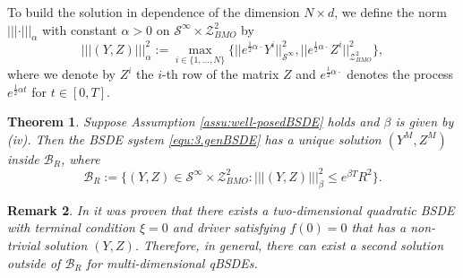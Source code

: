 \documentclass[10pt,a4paper]{article}
\theoremstyle{plain}
\newtheorem{Theorem}{Theorem}[section]
\newtheorem{Remark}[Theorem]{Remark}
\theoremstyle{definition}
\numberwithin{equation}{section}
\newcommand{\trinm}[1]{\vert\!\vert\!\vert #1 \vert\!\vert\!\vert}
\begin{document}
    


To build the solution in dependence of the dimension $N \times d$, we define the norm $\trinm{ \cdot }_\alpha$ with constant $\alpha>0$ on $\mathcal{S}^{\infty} \times \mathcal{Z}_{BMO}^{2}$ by
\[
\trinm{(Y,Z)}_\alpha^{2} := \max_{i \in \{1,...,N\}}\bigl\{||e^{\tfrac{1}{2}\alpha\cdot}Y^{i}||_{\mathcal{S}^{\infty}}^{2},||e^{\tfrac{1}{2}\alpha\cdot}Z^{i}||_{\mathcal{Z}_{BMO}^{2}}^{2}\bigr\},
\]
where we denote by $Z^{i}$ the $i$-th row of the matrix $Z$ and $e^{\tfrac{1}{2}\alpha\cdot}$ denotes the process $e^{\tfrac{1}{2}\alpha t}$ for $t \in [0,T]$. 


\begin{Theorem}
\label{Thm3.1}
Suppose Assumption \ref{assu:well-posedBSDE} holds and $\beta$ is given by \textnormal{(iv)}. Then the BSDE system \eqref{equ:3.genBSDE} has a unique solution $(Y^{M},Z^{M})$ inside $\mathcal{B}_{R}$, where  
\[
\mathcal{B}_{R} := \bigl\{(Y,Z) \in \mathcal{S}^{\infty} \times \mathcal{Z}_{BMO}^{2} : \trinm{(Y,Z)}_\beta^{2} \leq e^{\beta T}R^{2} \bigr\}.
\]
\end{Theorem}

\begin{Remark}
In \cite[Example 2.3]{RefN12} it was proven that there exists a two-dimensional quadratic BSDE with terminal condition $\xi = 0$ and driver satisfying $f(0)=0$ that has a non-trivial solution $(Y,Z)$. Therefore, in general, there can exist a second solution outside of $\mathcal{B}_{R}$ for multi-dimensional qBSDEs.
\end{Remark}

\end{document}
